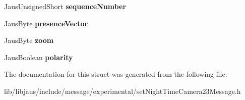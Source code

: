 \begin{DoxyCompactItemize}
\item 
\hypertarget{struct_set_night_time_camera23_message_struct_a9bf22d7f2a879a208c333216ee6bfef8}{\-Jaus\-Unsigned\-Short {\bfseries sequence\-Number}}\label{struct_set_night_time_camera23_message_struct_a9bf22d7f2a879a208c333216ee6bfef8}

\item 
\hypertarget{struct_set_night_time_camera23_message_struct_a7431c3e0abf08c2fae857bf2fa6ca600}{\-Jaus\-Byte {\bfseries presence\-Vector}}\label{struct_set_night_time_camera23_message_struct_a7431c3e0abf08c2fae857bf2fa6ca600}

\item 
\hypertarget{struct_set_night_time_camera23_message_struct_a5f476b9bdd4e09d121064e22100be470}{\-Jaus\-Byte {\bfseries zoom}}\label{struct_set_night_time_camera23_message_struct_a5f476b9bdd4e09d121064e22100be470}

\item 
\hypertarget{struct_set_night_time_camera23_message_struct_a1fb58be0bead325abb1cd81da39325dc}{\-Jaus\-Boolean {\bfseries polarity}}\label{struct_set_night_time_camera23_message_struct_a1fb58be0bead325abb1cd81da39325dc}

\end{DoxyCompactItemize}


\-The documentation for this struct was generated from the following file\-:\begin{DoxyCompactItemize}
\item 
lib/libjaus/include/message/experimental/set\-Night\-Time\-Camera23\-Message.\-h\end{DoxyCompactItemize}
